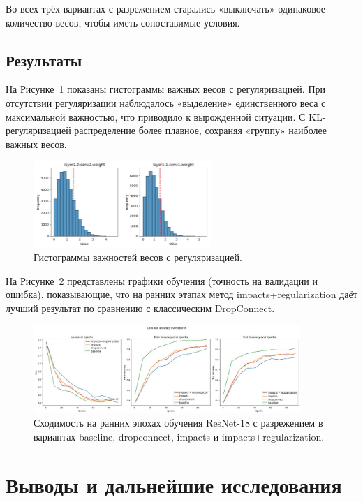 \documentclass{article}
\begin{document}
Во всех трёх вариантах с разрежением старались «выключать» одинаковое количество весов, чтобы иметь сопоставимые условия.

\subsection{Результаты}
На Рисунке~\ref{fig:hist} показаны гистограммы важных весов с регуляризацией. При отсутствии регуляризации наблюдалось «выделение» единственного веса с максимальной важностью, что приводило к вырожденной ситуации. С KL-регуляризацией распределение более плавное, сохраняя «группу» наиболее важных весов.

\begin{figure}[h]
    \centering
    \includegraphics[width=0.6\textwidth]{../figures/impacts.jpeg}
    \caption{Гистограммы важностей весов с регуляризацией.}
    \label{fig:hist}
\end{figure}

На Рисунке~\ref{fig:exp} представлены графики обучения (точность на валидации и ошибка), показывающие, что на ранних этапах метод impacts+regularization даёт лучший результат по сравнению с классическим DropConnect.

\begin{figure}[h]
    \centering
    \includegraphics[width=0.9\textwidth]{../figures/exp.png}
    \caption{Сходимость на ранних эпохах обучения ResNet-18 с разрежением в вариантах baseline, dropconnect, impacts и impacts+regularization.}
    \label{fig:exp}
\end{figure}

\section{Выводы и дальнейшие исследования}
\label{sec:conclusion}
\end{document}
